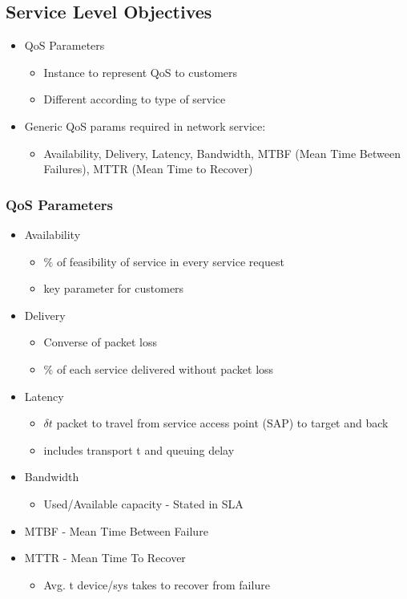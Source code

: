 \subsection{Service Level Objectives}
\begin{itemize}
	\item QoS Parameters
	\begin{itemize}
		\item Instance to represent QoS to customers
		\item Different according to type of service
	\end{itemize}
	\item Generic QoS params required in network service:
	\begin{itemize}
		\item Availability, Delivery, Latency, Bandwidth, MTBF (Mean
			Time Between Failures), MTTR (Mean Time to Recover)
	\end{itemize}
\end{itemize}
\subsubsection{QoS Parameters}
\begin{itemize}
	\item Availability
	\begin{itemize}
		\item $\%$ of feasibility of service in every service request
		\item key parameter for customers
	\end{itemize}
\item Delivery
	\begin{itemize}
		\item Converse of packet loss
		\item $\%$ of each service delivered without packet loss
	\end{itemize}
\item Latency
	\begin{itemize}
		\item $\delta t$ packet to travel from service access point
			(SAP) to target and back
		\item includes transport t and queuing delay
	\end{itemize}
\item Bandwidth
	\begin{itemize}
		\item Used/Available capacity - Stated in SLA
	\end{itemize}
\item MTBF - Mean Time Between Failure
\item MTTR - Mean Time To Recover
	\begin{itemize}
		\item Avg. t device/sys takes to recover from failure
	\end{itemize}
\end{itemize}
